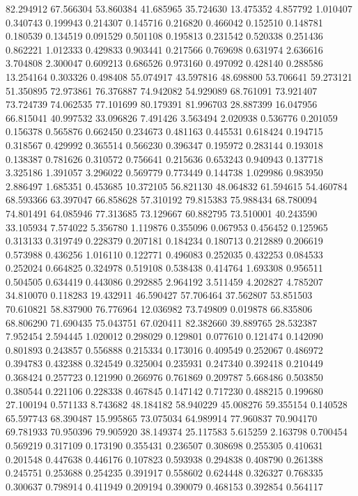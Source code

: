 82.294912
67.566304
53.860384
41.685965
35.724630
13.475352
4.857792
1.010407
0.340743
0.199943
0.214307
0.145716
0.216820
0.466042
0.152510
0.148781
0.180539
0.134519
0.091529
0.501108
0.195813
0.231542
0.520338
0.251436
0.862221
1.012333
0.429833
0.903441
0.217566
0.769698
0.631974
2.636616
3.704808
2.300047
0.609213
0.686526
0.973160
0.497092
0.428140
0.288586
13.254164
0.303326
0.498408
55.074917
43.597816
48.698800
53.706641
59.273121
51.350895
72.973861
76.376887
74.942082
54.929089
68.761091
73.921407
73.724739
74.062535
77.101699
80.179391
81.996703
28.887399
16.047956
66.815041
40.997532
33.096826
7.491426
3.563494
2.020938
0.536776
0.201059
0.156378
0.565876
0.662450
0.234673
0.481163
0.445531
0.618424
0.194715
0.318567
0.429992
0.365514
0.566230
0.396347
0.195972
0.283144
0.193018
0.138387
0.781626
0.310572
0.756641
0.215636
0.653243
0.940943
0.137718
3.325186
1.391057
3.296022
0.569779
0.773449
0.144738
1.029986
0.983950
2.886497
1.685351
0.453685
10.372105
56.821130
48.064832
61.594615
54.460784
68.593366
63.397047
66.858628
57.310192
79.815383
75.988434
68.780094
74.801491
64.085946
77.313685
73.129667
60.882795
73.510001
40.243590
33.105934
7.574022
5.356780
1.119876
0.355096
0.067953
0.456452
0.125965
0.313133
0.319749
0.228379
0.207181
0.184234
0.180713
0.212889
0.206619
0.573988
0.436256
1.016110
0.122771
0.496083
0.252035
0.432253
0.084533
0.252024
0.664825
0.324978
0.519108
0.538438
0.414764
1.693308
0.956511
0.504505
0.634419
0.443086
0.292885
2.964192
3.511459
4.202827
4.785207
34.810070
0.118283
19.432911
46.590427
57.706464
37.562807
53.851503
70.610821
58.837900
76.776964
12.036982
73.749809
0.019878
66.835806
68.806290
71.690435
75.043751
67.020411
82.382660
39.889765
28.532387
7.952454
2.594445
1.020012
0.298029
0.129801
0.077610
0.121474
0.142090
0.801893
0.243857
0.556888
0.215334
0.173016
0.409549
0.252067
0.486972
0.394783
0.432388
0.324549
0.325004
0.235931
0.247340
0.392418
0.210449
0.368424
0.257723
0.121990
0.266976
0.761869
0.209787
5.668486
0.503850
0.380544
0.221106
0.228338
0.467845
0.147142
0.717230
0.488215
0.199680
27.100194
0.571133
8.743682
48.184182
58.940229
45.008276
59.355154
0.140528
65.597743
68.390487
15.995865
73.075034
64.989914
77.960837
70.904170
69.781933
70.950396
79.905920
38.149374
25.117583
5.615259
2.163798
0.700454
0.569219
0.317109
0.173190
0.355431
0.236507
0.308698
0.255305
0.410631
0.201548
0.447638
0.446176
0.107823
0.593938
0.294838
0.408790
0.261388
0.245751
0.253688
0.254235
0.391917
0.558602
0.624448
0.326327
0.768335
0.300637
0.798914
0.411949
0.209194
0.390079
0.468153
0.392854
0.564117
